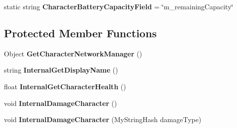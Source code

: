\begin{DoxyCompactItemize}
\item 
\hypertarget{class_s_e_mod_a_p_i_internal_1_1_a_p_i_1_1_entity_1_1_sector_1_1_sector_object_1_1_character_entity_a3869a73001170d31eb9e0f28b4c7a36c}{}static string {\bfseries Character\+Battery\+Capacity\+Field} = \char`\"{}m\+\_\+remaining\+Capacity\char`\"{}\label{class_s_e_mod_a_p_i_internal_1_1_a_p_i_1_1_entity_1_1_sector_1_1_sector_object_1_1_character_entity_a3869a73001170d31eb9e0f28b4c7a36c}

\end{DoxyCompactItemize}
\subsection*{Protected Member Functions}
\begin{DoxyCompactItemize}
\item 
\hypertarget{class_s_e_mod_a_p_i_internal_1_1_a_p_i_1_1_entity_1_1_sector_1_1_sector_object_1_1_character_entity_af31e33c69318527a3b890a18b5c7e5c8}{}Object {\bfseries Get\+Character\+Network\+Manager} ()\label{class_s_e_mod_a_p_i_internal_1_1_a_p_i_1_1_entity_1_1_sector_1_1_sector_object_1_1_character_entity_af31e33c69318527a3b890a18b5c7e5c8}

\item 
\hypertarget{class_s_e_mod_a_p_i_internal_1_1_a_p_i_1_1_entity_1_1_sector_1_1_sector_object_1_1_character_entity_a83b9ab9e527168edc3cc9d57d06bfde1}{}string {\bfseries Internal\+Get\+Display\+Name} ()\label{class_s_e_mod_a_p_i_internal_1_1_a_p_i_1_1_entity_1_1_sector_1_1_sector_object_1_1_character_entity_a83b9ab9e527168edc3cc9d57d06bfde1}

\item 
\hypertarget{class_s_e_mod_a_p_i_internal_1_1_a_p_i_1_1_entity_1_1_sector_1_1_sector_object_1_1_character_entity_a174ffd909991ea52b2e3e65a5f68598f}{}float {\bfseries Internal\+Get\+Character\+Health} ()\label{class_s_e_mod_a_p_i_internal_1_1_a_p_i_1_1_entity_1_1_sector_1_1_sector_object_1_1_character_entity_a174ffd909991ea52b2e3e65a5f68598f}

\item 
\hypertarget{class_s_e_mod_a_p_i_internal_1_1_a_p_i_1_1_entity_1_1_sector_1_1_sector_object_1_1_character_entity_a451435106702aa219a3f93f2444c34cb}{}void {\bfseries Internal\+Damage\+Character} ()\label{class_s_e_mod_a_p_i_internal_1_1_a_p_i_1_1_entity_1_1_sector_1_1_sector_object_1_1_character_entity_a451435106702aa219a3f93f2444c34cb}

\item 
\hypertarget{class_s_e_mod_a_p_i_internal_1_1_a_p_i_1_1_entity_1_1_sector_1_1_sector_object_1_1_character_entity_ad1614abf8442bbdb105d0cc11f2e2ed4}{}void {\bfseries Internal\+Damage\+Character} (My\+String\+Hash damage\+Type)\label{class_s_e_mod_a_p_i_internal_1_1_a_p_i_1_1_entity_1_1_sector_1_1_sector_object_1_1_character_entity_ad1614abf8442bbdb105d0cc11f2e2ed4}


\end{DoxyCompactItemize}

